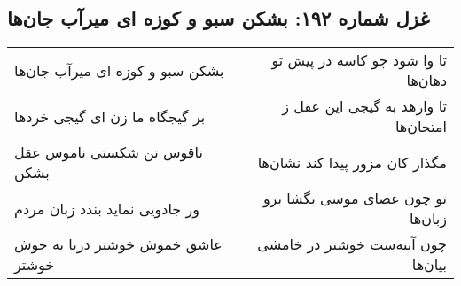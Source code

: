 \begin{center}
\section*{غزل شماره ۱۹۲: بشکن سبو و کوزه ای میرآب جان‌ها}
\label{sec:0192}
\begin{longtable}{l p{0.5cm} r}
بشکن سبو و کوزه ای میرآب جان‌ها
&&
تا وا شود چو کاسه در پیش تو دهان‌ها
\\
بر گیجگاه ما زن ای گیجی خردها
&&
تا وارهد به گیجی این عقل ز امتحان‌ها
\\
ناقوس تن شکستی ناموس عقل بشکن
&&
مگذار کان مزور پیدا کند نشان‌ها
\\
ور جادویی نماید بندد زبان مردم
&&
تو چون عصای موسی بگشا برو زبان‌ها
\\
عاشق خموش خوشتر دریا به جوش خوشتر
&&
چون آینه‌ست خوشتر در خامشی بیان‌ها
\\
\end{longtable}
\end{center}
